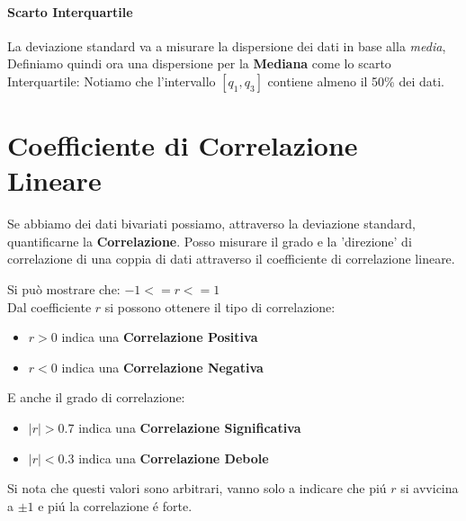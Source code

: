 \paragraph{Scarto Interquartile}
La deviazione standard va a misurare la dispersione dei dati in base alla \emph{media}, 
Definiamo quindi ora una dispersione per la \textbf{Mediana} come lo scarto Interquartile:
Notiamo che l'intervallo $[q_1,q_3]$ contiene almeno il 50\% dei dati.

\section{Coefficiente di Correlazione Lineare}
Se abbiamo dei dati bivariati possiamo, attraverso la deviazione standard, quantificarne la \textbf{Correlazione}.
Posso misurare il grado e la 'direzione' di correlazione di una coppia di dati attraverso il coefficiente di correlazione lineare. 

Si può mostrare che: $-1<=r<=1$
\\Dal coefficiente $r$ si possono ottenere il tipo di correlazione:
\begin{itemize}
    \item $r > 0$ indica una \textbf{Correlazione Positiva }
    \item $r < 0$ indica una \textbf{Correlazione Negativa }
\end{itemize}
E anche il grado di correlazione:
\begin{itemize}
    \item $|r| > 0.7$ indica una \textbf{Correlazione Significativa}
    \item $|r| < 0.3$ indica una \textbf{Correlazione Debole}
\end{itemize}
Si nota che questi valori sono arbitrari, vanno solo a indicare che piú $r$ si avvicina a $\pm 1$ e piú la correlazione é forte.
